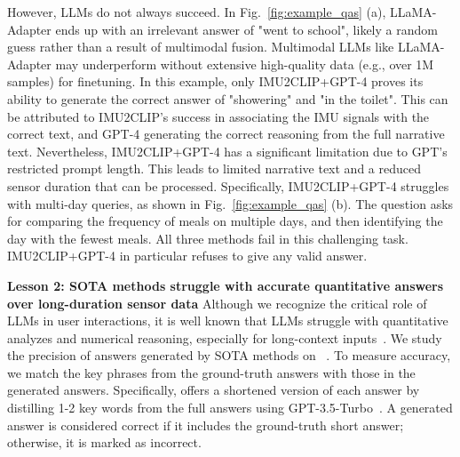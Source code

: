 
However, LLMs do not always succeed.
In Fig.~\ref{fig:example_qas} (a), LLaMA-Adapter ends up with an irrelevant answer of "went to school", likely a random guess rather than a result of multimodal fusion. Multimodal LLMs like LLaMA-Adapter may underperform without extensive high-quality data (e.g., over 1M samples) for finetuning.
In this example, only IMU2CLIP+GPT-4 proves its ability to generate the correct answer of "showering" and "in the toilet". This can be attributed to IMU2CLIP's success in associating the IMU signals with the correct text, and GPT-4 generating the correct reasoning from the full narrative text.
Nevertheless, IMU2CLIP+GPT-4 has a significant limitation due to GPT's restricted prompt length.
This leads to limited narrative text and a reduced sensor duration that can be processed.
Specifically, IMU2CLIP+GPT-4 struggles with multi-day queries, as shown in Fig.~\ref{fig:example_qas} (b).
The question asks for comparing the frequency of meals on multiple days, and then identifying the day with the fewest meals. All three methods fail in this challenging task. %
IMU2CLIP+GPT-4 in particular refuses to give any valid answer.

\textbf{Lesson 2: SOTA methods struggle with accurate quantitative answers over long-duration sensor data}
Although we recognize the critical role of LLMs in user interactions, it is well known that LLMs struggle with quantitative analyzes and numerical reasoning, especially for long-context inputs~\cite{li2024long,gu2023mamba}.
We study the precision of answers generated by SOTA methods on \Dataset~\citesensorqa.
To measure accuracy, we match the key phrases from the ground-truth answers with those in the generated answers.
Specifically, \Dataset offers a shortened version of each answer by distilling 1-2 key words from the full answers using GPT-3.5-Turbo~\cite{gpt-3.5}. A generated answer is considered correct if it includes the ground-truth short answer; otherwise, it is marked as incorrect.

